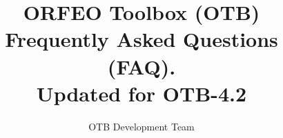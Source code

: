 \documentclass[english]{article}
\begin{document}
\title{ORFEO Toolbox (OTB) Frequently Asked Questions (FAQ).\\ Updated
  for OTB-4.2}


\author{OTB Development Team}


\maketitle

\tableofcontents



%

%
\end{document}

